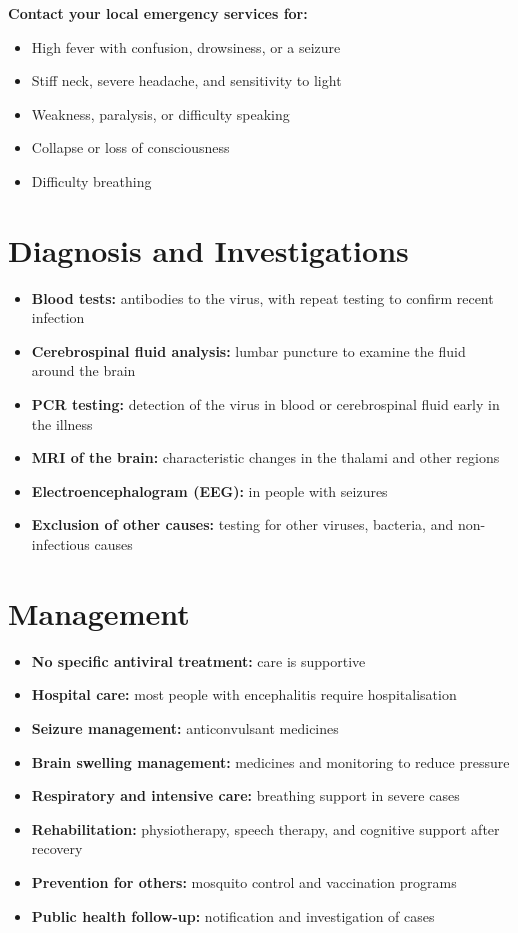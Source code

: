 \textbf{Contact your local emergency services for:}
\begin{itemize}
    \item High fever with confusion, drowsiness, or a seizure
    \item Stiff neck, severe headache, and sensitivity to light
    \item Weakness, paralysis, or difficulty speaking
    \item Collapse or loss of consciousness
    \item Difficulty breathing
\end{itemize}

\section*{Diagnosis and Investigations}
\begin{itemize}
    \item \textbf{Blood tests:} antibodies to the virus, with repeat testing to confirm recent infection
    \item \textbf{Cerebrospinal fluid analysis:} lumbar puncture to examine the fluid around the brain
    \item \textbf{PCR testing:} detection of the virus in blood or cerebrospinal fluid early in the illness
    \item \textbf{MRI of the brain:} characteristic changes in the thalami and other regions
    \item \textbf{Electroencephalogram (EEG):} in people with seizures
    \item \textbf{Exclusion of other causes:} testing for other viruses, bacteria, and non-infectious causes
\end{itemize}

\section*{Management}
\begin{itemize}
    \item \textbf{No specific antiviral treatment:} care is supportive
    \item \textbf{Hospital care:} most people with encephalitis require hospitalisation
    \item \textbf{Seizure management:} anticonvulsant medicines
    \item \textbf{Brain swelling management:} medicines and monitoring to reduce pressure
    \item \textbf{Respiratory and intensive care:} breathing support in severe cases
    \item \textbf{Rehabilitation:} physiotherapy, speech therapy, and cognitive support after recovery
    \item \textbf{Prevention for others:} mosquito control and vaccination programs
    \item \textbf{Public health follow-up:} notification and investigation of cases
\end{itemize}

